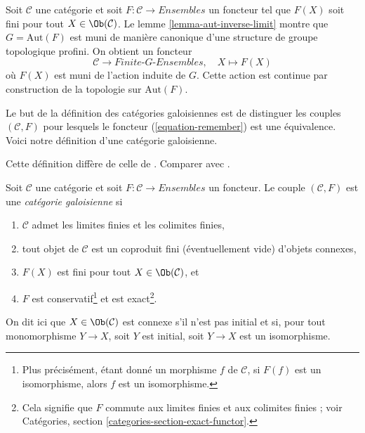\begin{example}
\label{example-from-C-F-to-G-sets}
Soit $\mathcal{C}$ une catégorie et soit
$F : \mathcal{C} \to \textit{Ensembles}$ un foncteur tel que $F(X)$ soit fini
pour tout $X \in \Ob(\mathcal{C})$. Le lemme
\ref{lemma-aut-inverse-limit} montre que $G = \text{Aut}(F)$ est muni de
manière canonique d'une structure de groupe topologique profini. On obtient
un foncteur
\begin{equation}
\label{equation-remember}
\mathcal{C} \longrightarrow \textit{Finite-}G\textit{-Ensembles},\quad
X \longmapsto F(X)
\end{equation}
où $F(X)$ est muni de l'action induite de $G$. Cette action est continue par
construction de la topologie sur $\text{Aut}(F)$.
\end{example}

\noindent
Le but de la définition des catégories galoisiennes est de distinguer les
couples $(\mathcal{C}, F)$ pour lesquels le foncteur (\ref{equation-remember})
est une équivalence. Voici notre définition d'une catégorie galoisienne.

\begin{definition}
\label{definition-galois-category}
\begin{reference}
Cette définition diffère de celle de \cite[Expos\'e V, Définition 5.1]{SGA1}.
Comparer avec \cite[Définition 7.2.1]{BS}.
\end{reference}
Soit $\mathcal{C}$ une catégorie et soit $F : \mathcal{C} \to \textit{Ensembles}$
un foncteur. Le couple $(\mathcal{C}, F)$ est une {\it catégorie galoisienne} si
\begin{enumerate}
\item $\mathcal{C}$ admet les limites finies et les colimites finies,
\item
\label{item-connected-components}
tout objet de $\mathcal{C}$ est un coproduit fini (éventuellement vide)
d'objets connexes,
\item $F(X)$ est fini pour tout $X \in \Ob(\mathcal{C})$, et
\item $F$ est conservatif\footnote{Plus précisément, étant donné un morphisme
$f$ de $\mathcal{C}$, si $F(f)$ est un isomorphisme, alors
$f$ est un isomorphisme.} et est exact\footnote{Cela signifie que
$F$ commute aux limites finies et aux colimites finies ; voir
Catégories, section \ref{categories-section-exact-functor}.}.
\end{enumerate}
On dit ici que $X \in \Ob(\mathcal{C})$ est connexe s'il
n'est pas initial et si, pour tout monomorphisme $Y \to X$,
soit $Y$ est initial, soit $Y \to X$ est un isomorphisme.
\end{definition}

